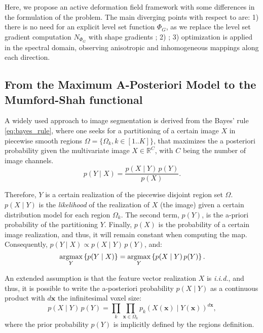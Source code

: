 Here, we propose an active deformation field framework with some differences in
the formulation of the problem. The main diverging points with respect to
\citep{gorthi_active_2011} are: 1) there is no need for an explicit level set function
$\Phi_G$, as we replace the level set gradient computation $N_{\Phi_G}$ with shape
gradients \citep{jehan-besson_dream2s:_2003,herbulot_segmentation_2006}; 2) 
; 3) optimization is applied in the spectral
domain, observing anisotropic and inhomogeneous mappings along each direction.


\subsection{From the Maximum A-Posteriori Model to the Mumford-Shah functional}
\label{sec:methods_map}
%
A widely used approach to image segmentation is derived from the
Bayes' rule \eqref{eq:bayes_rule}, where one seeks for a partitioning
of a certain image $X$ in piecewise smooth regions $\Omega = \lbrace \Omega_k , 
k\in\left[ 1 .. K \right] \rbrace$,  that maximizes the a posteriori 
probability given the multivariate image $X \in \mathbb{R}^C$, 
with $C$ being the number of image channels.
\begin{equation}
p(Y \mid X) = \frac{p(X \mid Y)\, p(Y)}{p(X)}.
\label{eq:bayes_rule}
\end{equation}

Therefore, $Y$ is a certain realization of the piecewise 
disjoint region set $\Omega$. $p(X \mid Y)$ is the \emph{likelihood} of 
the realization of $X$ (the image) given a certain distribution model for 
each region $\Omega_k$. The second term, $p(Y)$, is the a-priori probability of 
the partitioning $Y$. Finally, $p(X)$ is the probability of a certain image 
realization, and thus, it will remain constant when computing the \gls{map}.
Consequently, $p(Y \mid X) \propto p(X \mid Y)\, p(Y)$, and:
\begin{equation}
\underset{Y}{\operatorname{argmax}} \left\{ p(Y \mid X) \right\} = 
\underset{Y}{\operatorname{argmax}} \left\{ p(X \mid Y)\, p(Y) \right\}.
\end{equation}


An extended assumption is that the feature vector realization $X$ is
\emph{i.i.d.}, and thus, it is possible to write the a-posteriori
probability $p(X \mid Y)$ as a continuous product with $d\mathbf{x}$ the
infinitesimal voxel size:
\begin{equation}
p(X \mid Y) \, p(Y) = \underset{k}{\prod} \underset{\mathbf{x}\in \Omega_k}{\prod}
p_k( X(\mathbf{x}) \mid Y(\mathbf{x}) )^{d\mathbf{x}},
\label{eq:bayes_aposteriori}
\end{equation}
where the prior probability $p(Y)$ is implicitly
defined by the regions definition. 


